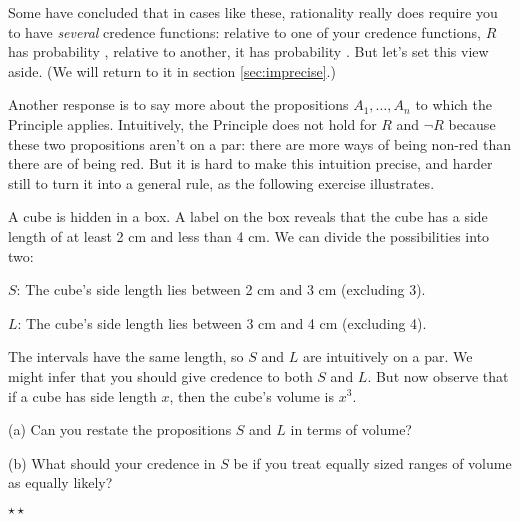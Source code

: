 Some have concluded that in cases like these, rationality really does
require you to have \emph{several} credence functions: relative to one
of your credence functions, $R$ has probability ,
relative to another, it has probability . But let's set
this view aside. (We will return to it in section
\ref{sec:imprecise}.)

Another response is to say more about the propositions
$A_1,\ldots,A_n$ to which the Principle applies. Intuitively, the
Principle does not hold for $R$ and $\neg R$ because these two
propositions aren't on a par: there are more ways of being non-red
than there are of being red. But it is hard to make this
intuition precise, and harder still to turn it into a general rule, as
the following exercise illustrates.

\begin{exercise}\label{e:cubefactory}
  A cube is hidden in a box. A label on the box reveals that the cube
  has a side length of at least 2 cm and less than 4 cm. We can divide
  the possibilities into two:
  \begin{enumerate*}
  \item[$S$:] The cube's side length lies between 2 cm and 3 cm (excluding 3).
  \item[$L$:] The cube's side length lies between 3 cm and 4 cm (excluding 4).
  \end{enumerate*}
  The intervals have the same length, so $S$ and $L$ are intuitively
  on a par. We might infer that you should give credence
   to both $S$ and $L$. But now observe that if a cube
  has side length $x$, then the cube's volume is $x^3$.
  \begin{enumerate*}
  \item[(a)] Can you restate the propositions $S$ and $L$ in terms of
    volume?
  \item[(b)] What should your credence in $S$ be if you treat equally
    sized ranges of volume as equally likely?
  \end{enumerate*}
  $\star\star$
\end{exercise}

